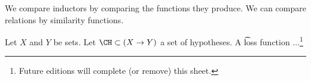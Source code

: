 

We compare inductors by comparing the functions they produce.
We can compare relations by similarity functions.


Let $X$ and $Y$ be sets. Let $\CH \subset (X \to Y)$ a set of hypotheses.
A \t{loss function} ...\footnote{Future editions will complete (or remove) this sheet.}


\blankpage
